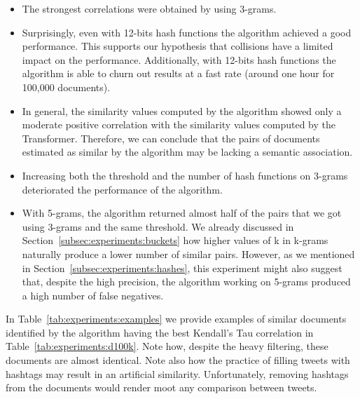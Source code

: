 \documentclass[runningheads]{llncs}
\begin{document}
\begin{itemize}
  \item The strongest correlations were obtained by using 3-grams.
  \item Surprisingly, even with 12-bits hash functions the algorithm achieved a good performance. This supports our hypothesis that collisions have a limited impact on the performance. Additionally, with 12-bits hash functions the algorithm is able to churn out results at a fast rate (around one hour for 100,000 documents).   
  \item In general, the similarity values computed by the algorithm showed only a moderate positive correlation with the similarity values computed by the Transformer. Therefore, we can conclude that the pairs of documents estimated as similar by the algorithm may be lacking a semantic association.
  \item Increasing both the threshold and the number of hash functions on 3-grams deteriorated the performance of the algorithm.
  \item With 5-grams, the algorithm returned almost half of the pairs that we got using 3-grams and the same threshold. We already discussed in Section~\ref{subsec:experiments:buckets} how higher values of k in k-grams naturally produce a lower number of similar pairs. However, as we mentioned in Section~\ref{subsec:experiments:hashes}, this experiment might also suggest that, despite the high precision, the algorithm working on 5-grams produced a high number of false negatives. 
\end{itemize}

In Table~\ref{tab:experiments:examples} we provide examples of similar documents identified by the algorithm having the best Kendall's Tau correlation in Table~\ref{tab:experiments:d100k}. Note how, despite the heavy filtering, these documents are almost identical. Note also how the practice of filling tweets with hashtags may result in an artificial similarity. Unfortunately, removing hashtags from the documents would render moot any comparison between tweets. 
\end{document}
